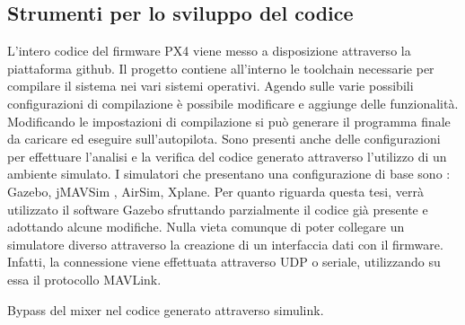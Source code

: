 \subsection{Strumenti per lo sviluppo del codice}
L'intero codice del firmware PX4 viene messo a disposizione attraverso la piattaforma github. Il progetto contiene all'interno le toolchain necessarie per compilare il sistema nei vari sistemi operativi. Agendo sulle varie possibili configurazioni di compilazione è possibile modificare e aggiunge delle funzionalità. Modificando le impostazioni di compilazione si può generare il programma finale da caricare ed eseguire sull'autopilota.
Sono presenti anche delle configurazioni per effettuare l'analisi e la verifica del codice generato attraverso l'utilizzo di un ambiente simulato. I simulatori che presentano una configurazione di base sono : Gazebo, jMAVSim , AirSim, Xplane. Per quanto riguarda questa tesi, verrà utilizzato il software Gazebo sfruttando parzialmente il codice già presente e adottando alcune modifiche. Nulla vieta comunque di poter collegare un simulatore diverso attraverso la creazione di un interfaccia dati con il firmware. Infatti, la connessione viene effettuata attraverso UDP o seriale, utilizzando su essa il protocollo MAVLink.


\begin{idee}
	Bypass del mixer nel codice generato attraverso simulink.
\end{idee}

